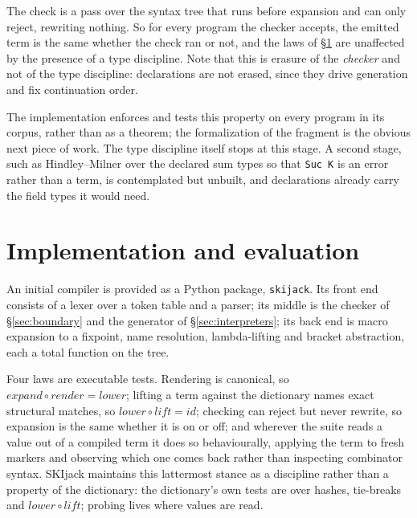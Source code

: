 \documentclass[english,submission,code=tt]{programming}
\begin{document}
The check is a pass over the syntax tree that runs before expansion and
can only reject, rewriting nothing.  So for every program the checker
accepts, the emitted term is the same whether the check ran or not, and
the laws of \S\ref{sec:impl} are unaffected by the presence of a type
discipline.  Note that this is erasure of the \emph{checker} and not of
the type discipline: declarations are not erased, since they drive
generation and fix continuation order.

The implementation enforces and tests this property on every program in 
its corpus, rather than as a theorem; the formalization of the fragment 
is the obvious next piece of work.  The type discipline itself stops at 
this stage.  A second stage, such as Hindley--Milner over the declared 
sum types so that \texttt{Suc K} is an error rather than a term, is 
contemplated but unbuilt, and declarations already carry the field 
types it would need.

\section{Implementation and evaluation}\label{sec:impl}

An initial compiler is provided as a Python package, \texttt{skijack}.  
Its front end consists of a lexer over a token table and a parser; its 
middle is the checker of \S\ref{sec:boundary} and the generator of 
\S\ref{sec:interpreters}; its back end is macro expansion to a 
fixpoint, name resolution, lambda-lifting and bracket abstraction, each 
a total function on the tree.

Four laws are executable tests.
Rendering is
canonical, so $\mathit{expand} \circ \mathit{render} = \mathit{lower}$;
lifting a term against the dictionary names exact structural matches, 
so $\mathit{lower} \circ \mathit{lift} = \mathit{id}$;
checking can reject but never rewrite, so expansion is the same whether
it is on or off; and wherever the suite reads a value out of a compiled 
term it does so behaviourally, applying the term to fresh markers and
observing which one comes back rather than inspecting combinator syntax.
SKIjack maintains this lattermost stance as a discipline rather than a 
property of the dictionary: the dictionary's own tests are over hashes, 
tie-breaks and $\mathit{lower} \circ \mathit{lift}$; probing lives 
where values are read.
\end{document}
